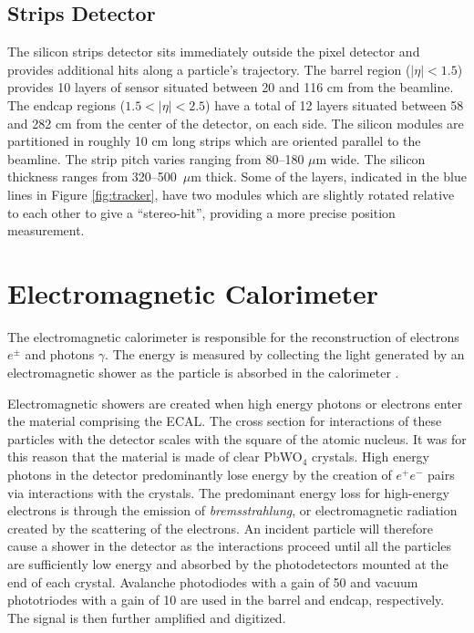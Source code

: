 \subsection{Strips Detector}

The silicon strips detector sits immediately outside the pixel detector and provides additional hits along a particle's trajectory. The barrel region ($|\eta|<1.5$) provides 10 layers of sensor situated between 20 and 116 cm from the beamline. The endcap regions ($1.5<|\eta|<2.5$) have a total of 12 layers situated between 58 and 282 cm from the center of the detector, on each side. The silicon modules are partitioned in roughly 10 cm long strips which are oriented parallel to the beamline. The strip pitch varies ranging from 80--180 $\mu$m wide. The silicon thickness ranges from 320--500~$\mu$m thick. Some of the layers, indicated in the blue lines in Figure \ref{fig:tracker}, have two modules which are slightly rotated relative to each other to give a ``stereo-hit'', providing a more precise position measurement.

\section{Electromagnetic Calorimeter}

The electromagnetic calorimeter is responsible for the reconstruction of electrons $e^{\pm}$ and photons $\gamma$. The energy is measured by collecting the light generated by an electromagnetic shower as the particle is absorbed in the calorimeter \cite{ecaltdr, ecaltdradd}. 

Electromagnetic showers are created when high energy photons or electrons enter the material comprising the ECAL. The cross section for interactions of these particles with the detector scales with the square of the atomic nucleus. It was for this reason that the material is made of clear PbWO$_{4}$ crystals. High energy photons in the detector predominantly lose energy by the creation of $e^{+}e^{-}$ pairs via interactions with the crystals. The predominant energy loss for high-energy electrons is through the emission of \textit{bremsstrahlung}, or electromagnetic radiation created by the scattering of the electrons. An incident particle will therefore cause a shower in the detector as the interactions proceed until all the particles are sufficiently low energy and absorbed by the photodetectors mounted at the end of each crystal. Avalanche photodiodes with a gain of 50 and vacuum phototriodes with a gain of 10 are used in the barrel and endcap, respectively. The signal is then further amplified and digitized.

